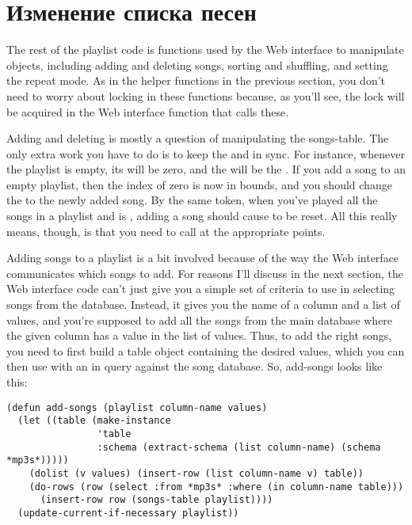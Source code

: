 \section{Изменение списка песен}

The rest of the playlist code is functions used by the Web interface to manipulate
 objects, including adding and deleting songs, sorting and shuffling, and setting
the repeat mode. As in the helper functions in the previous section, you don't need to
worry about locking in these functions because, as you'll see, the lock will be acquired
in the Web interface function that calls these.

Adding and deleting is mostly a question of manipulating the songs-table. The only extra
work you have to do is to keep the  and  in sync. For
instance, whenever the playlist is empty, its  will be zero, and the
 will be the . If you add a song to an
empty playlist, then the index of zero is now in bounds, and you should change the
 to the newly added song. By the same token, when you've played all the songs
in a playlist and  is , adding a song
should cause  to be reset. All this really means, though, is that you
need to call  at the appropriate points.

Adding songs to a playlist is a bit involved because of the way the Web interface
communicates which songs to add. For reasons I'll discuss in the next section, the Web
interface code can't just give you a simple set of criteria to use in selecting songs from
the database. Instead, it gives you the name of a column and a list of values, and you're
supposed to add all the songs from the main database where the given column has a value in
the list of values. Thus, to add the right songs, you need to first build a table object
containing the desired values, which you can then use with an in query against the song
database. So, add-songs looks like this:

\begin{lstlisting}
(defun add-songs (playlist column-name values)
  (let ((table (make-instance
                'table 
                :schema (extract-schema (list column-name) (schema *mp3s*)))))
    (dolist (v values) (insert-row (list column-name v) table))
    (do-rows (row (select :from *mp3s* :where (in column-name table)))
      (insert-row row (songs-table playlist))))
  (update-current-if-necessary playlist))
\end{lstlisting}

